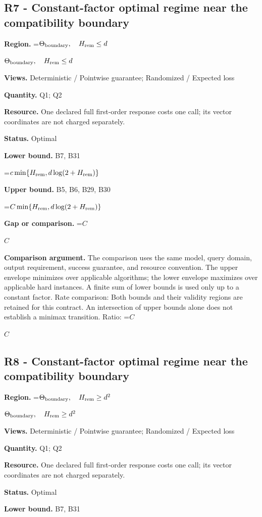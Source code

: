 \documentclass[10pt,a4paper]{article}
\newcommand{\AtlasMath}[1]{\par\begingroup\centering\setbox0=\hbox{$\displaystyle #1$}\ifdim\wd0>1.4\linewidth\typeout{ATLAS WIDE FORMULA: \the\wd0}\fi\ifdim\wd0>\linewidth\resizebox{\linewidth}{!}{\box0}\else\box0\fi\par\endgroup}
\newcommand{\AtlasInlineMath}[1]{\begingroup\setbox0=\hbox{$#1$}\ifdim\wd0>.4\linewidth\endgroup\AtlasMath{#1}\else\endgroup$#1$\fi}
\begin{document}
\subsection{R7 - Constant-factor optimal regime near the compatibility boundary}
\textbf{Region.} \AtlasInlineMath{\Theta_{\rm boundary},\quad H_{\rm rem}\le d}

\textbf{Views.} Deterministic / Pointwise guarantee; Randomized / Expected loss

\textbf{Quantity.} Q1; Q2

\textbf{Resource.} One declared full first-order response costs one call; its vector coordinates are not charged separately.

\textbf{Status.} Optimal

\textbf{Lower bound.} B7, B31

\AtlasMath{c\min\{H_{\rm rem},d\log(2+H_{\rm rem})\}}
\textbf{Upper bound.} B5, B6, B29, B30

\AtlasMath{C\min\{H_{\rm rem},d\log(2+H_{\rm rem})\}}
\textbf{Gap or comparison.} \AtlasInlineMath{C}

\textbf{Comparison argument.} The comparison uses the same model, query domain, output requirement, success guarantee, and resource convention. The upper envelope minimizes over applicable algorithms; the lower envelope maximizes over applicable hard instances. A finite sum of lower bounds is used only up to a constant factor. Rate comparison: Both bounds and their validity regions are retained for this contract. An intersection of upper bounds alone does not establish a minimax transition. Ratio: \AtlasInlineMath{C}

\subsection{R8 - Constant-factor optimal regime near the compatibility boundary}
\textbf{Region.} \AtlasInlineMath{\Theta_{\rm boundary},\quad H_{\rm rem}\ge d^2}

\textbf{Views.} Deterministic / Pointwise guarantee; Randomized / Expected loss

\textbf{Quantity.} Q1; Q2

\textbf{Resource.} One declared full first-order response costs one call; its vector coordinates are not charged separately.

\textbf{Status.} Optimal

\textbf{Lower bound.} B7, B31
\end{document}
